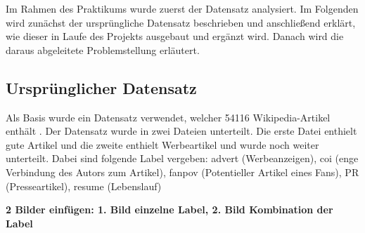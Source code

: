 
Im Rahmen des Praktikums wurde zuerst der Datensatz analysiert. Im Folgenden wird zunächst der ursprüngliche Datensatz beschrieben und anschließend erklärt, wie dieser in Laufe des Projekts ausgebaut und ergänzt wird. Danach wird die daraus abgeleitete Problemstellung erläutert.

\subsection{Ursprünglicher Datensatz}
\label{UrsprunglicherDatensatz}
Als Basis wurde ein Datensatz verwendet, welcher  54116 Wikipedia-Artikel enthält \cite{Urbanbricks2020}. Der Datensatz wurde in zwei Dateien unterteilt. Die erste Datei enthielt gute Artikel und die zweite enthielt %
Werbeartikel und wurde noch weiter unterteilt. Dabei sind folgende Label vergeben: advert (Werbeanzeigen), coi (enge Verbindung des Autors zum Artikel), fanpov (Potentieller Artikel eines Fans), PR  (Presseartikel), resume (Lebenslauf)

\textbf{2 Bilder einfügen: 1. Bild einzelne Label, 2. Bild Kombination der Label}
\\



